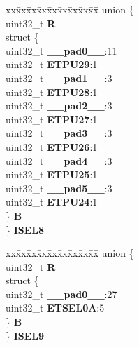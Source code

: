 \begin{DoxyCompactItemize}
\begin{tabbing}
\end{tabbing}\item 
\mbox{\label{structSIU__tag_afa0ab41d75f471abfafd9d036008f680}} 
\begin{tabbing}
xx\=xx\=xx\=xx\=xx\=xx\=xx\=xx\=xx\=\kill
union \{\\
\>uint32\_t {\bfseries R}\\
\>struct \{\\
\>\>uint32\_t {\bfseries \_\_pad0\_\_}:11\\
\>\>uint32\_t {\bfseries ETPU29}:1\\
\>\>uint32\_t {\bfseries \_\_pad1\_\_}:3\\
\>\>uint32\_t {\bfseries ETPU28}:1\\
\>\>uint32\_t {\bfseries \_\_pad2\_\_}:3\\
\>\>uint32\_t {\bfseries ETPU27}:1\\
\>\>uint32\_t {\bfseries \_\_pad3\_\_}:3\\
\>\>uint32\_t {\bfseries ETPU26}:1\\
\>\>uint32\_t {\bfseries \_\_pad4\_\_}:3\\
\>\>uint32\_t {\bfseries ETPU25}:1\\
\>\>uint32\_t {\bfseries \_\_pad5\_\_}:3\\
\>\>uint32\_t {\bfseries ETPU24}:1\\
\>\} {\bfseries B}\\
\} {\bfseries ISEL8}\\

\end{tabbing}\item 
\mbox{\label{structSIU__tag_a4f07ff5a1d4484d86e0c54241a72e918}} 
\begin{tabbing}
xx\=xx\=xx\=xx\=xx\=xx\=xx\=xx\=xx\=\kill
union \{\\
\>uint32\_t {\bfseries R}\\
\>struct \{\\
\>\>uint32\_t {\bfseries \_\_pad0\_\_}:27\\
\>\>uint32\_t {\bfseries ETSEL0A}:5\\
\>\} {\bfseries B}\\
\} {\bfseries ISEL9}\\


\end{tabbing}
\end{DoxyCompactItemize}
